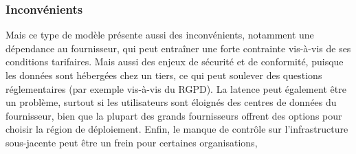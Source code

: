 \documentclass{rapportClass} %
\begin{document}

\subsubsection{Inconvénients}

Mais ce type de modèle présente aussi des inconvénients, notamment une dépendance au fournisseur, 
qui peut entraîner une forte contrainte vis-à-vis de ses conditions tarifaires. 
Mais aussi des enjeux de sécurité et de conformité, puisque les données sont hébergées chez un tiers, 
ce qui peut soulever des questions réglementaires (par exemple vis-à-vis du RGPD).
La latence peut également être un problème, surtout si les utilisateurs sont éloignés des centres de données du fournisseur, 
bien que la plupart des grands fournisseurs offrent des options pour choisir la région de déploiement.
Enfin, le manque de contrôle sur l’infrastructure sous-jacente peut être un frein pour certaines organisations,
      
\end{document}
